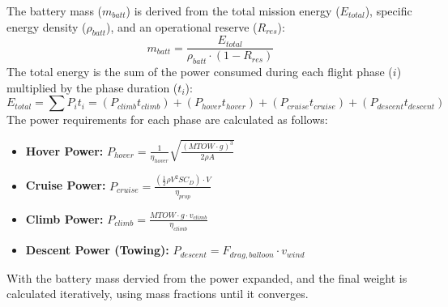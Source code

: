 The battery mass ($m_{batt}$) is derived from the total mission energy ($E_{total}$), specific energy density ($\rho_{batt}$), and an operational reserve ($R_{res}$):
\begin{equation}
    m_{batt} = \frac{E_{total}}{\rho_{batt} \cdot (1 - R_{res})}
\end{equation}
The total energy is the sum of the power consumed during each flight phase ($i$) multiplied by the phase duration ($t_i$):
\begin{equation}
    E_{total} = \sum P_i t_i = (P_{climb} t_{climb}) + (P_{hover} t_{hover}) + (P_{cruise} t_{cruise}) + (P_{descent} t_{descent})
\end{equation}
The power requirements for each phase are calculated as follows:
\begin{itemize}
    \item \textbf{Hover Power:} $P_{hover} = \frac{1}{\eta_{hover}} \sqrt{\frac{(MTOW \cdot g)^3}{2 \rho A}}$
    \item \textbf{Cruise Power:} $P_{cruise} = \frac{(\frac{1}{2} \rho V^2 S C_D) \cdot V}{\eta_{prop}}$
    \item \textbf{Climb Power:} $P_{climb} = \frac{MTOW \cdot g \cdot v_{climb}}{\eta_{climb}}$
    \item \textbf{Descent Power (Towing):} $P_{descent} = F_{drag, balloon} \cdot v_{wind}$
\end{itemize}

With the battery mass dervied from the power expanded, and the final weight is calculated iteratively, using mass fractions until it converges.






